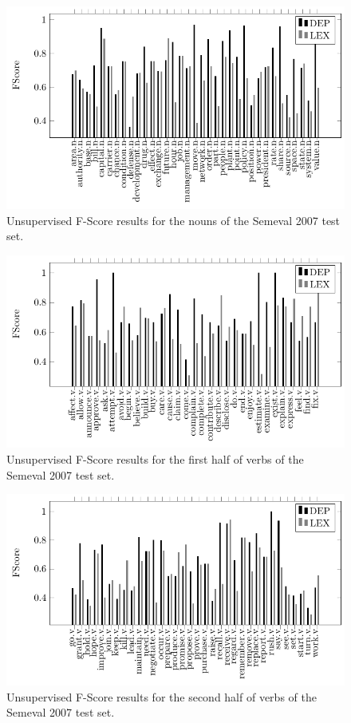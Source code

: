  \begin{figure}[!htb]
\centering
\includegraphics[width=1\linewidth]{images/Chapitre5/tex_img_files/nouns_fs.pdf}
\caption{Unsupervised F-Score results for the nouns of the Semeval 2007 test set.}
\label{fig:nouns_fs}
\end{figure}

 \begin{figure}[!htb]
\centering
\includegraphics[width=1\linewidth]{images/Chapitre5/tex_img_files/verbs_fs_2.pdf}
\caption{Unsupervised F-Score results for the first half of verbs of the Semeval 2007 test set.}
\label{fig:verbs_fs2}
\end{figure}

 \begin{figure}[!htb]
\centering
\includegraphics[width=1\linewidth]{images/Chapitre5/tex_img_files/verbs_fs_3.pdf}
\caption{Unsupervised F-Score results for the second half of verbs of the Semeval 2007 test set.}
\label{fig:verbs_fs3}
\end{figure}

